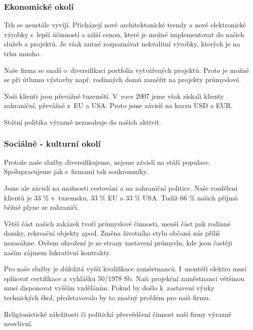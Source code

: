 \documentclass[a4paper, twoside, 11pt]{article}
\begin{document}
			\subsubsection{Ekonomické okolí}
				Trh se neustále vyvíjí. Přicházejí nové architektonické trendy a nové elektronické výrobky s~lepší účinností a nižší cenou, které je možné implementovat do našich služeb a projektů. Je však nutné rozpoznávat nekvalitní výrobky, kterých je na trhu mnoho.\par
Naše firma se snaží o~diversifikaci portfolia vytvářených projektů. Proto je možné se při útlumu výstavby např. rodinných domů zaměřit na projekty průmyslové.\par
Naši klienti jsou převážně tuzemští. V~roce 2007 jsme však získali klienty zahraniční, převážně z~EU a USA. Proto jsme závislí na kurzu USD a EUR.\par
Státní politika výrazně nezasahuje do našich aktivit.

			\subsubsection{Sociálně - kulturní okolí}
				Protože naše služby diversifikujeme, nejsme závislí na stáří populace. Spolupracujeme jak s~firmami tak soukromníky.\par
Jsme ale závislí na možnosti cestování a na zahraniční politice. Naše rozdělení klientů je 33 \% v~tuzemsku, 33 \% EU a 33 \% USA. Tudíž 66 \% našich příjmů běžně plyne ze zahraničí.\par
				Větší část našich zakázek tvoří průmyslové činnosti, menší část pak rodinné domky, rekreační objekty apod. Změna životního stylu občanů nás příliš nezasáhne. Ovšem ohrožení je ze strany zastavení průmyslu, kde jsou častěji naším zájmem lukrativní kontrakty.\par
Pro naše služby je důležitá vyšší kvalifikace zaměstnanců. I~montéři elektro musí splňovat certifikace a vyhlášku 50/1978 Sb. Naši projekční zaměstnanci většinou musí disponovat vyšším vzděláním. Pokud by došlo k~zastavení výuky technických škol, představovalo by to značný problém pro naši firmu.\par
				Religionistické záležitosti či politická přesvědčení činnost naší firmy výrazně neovlivní.
	
\end{document}
